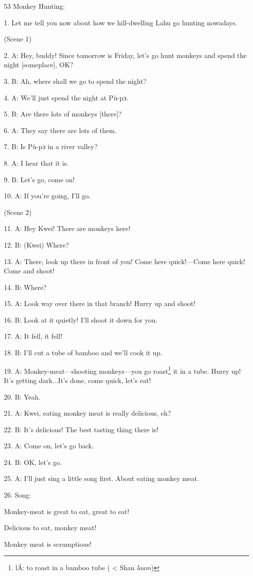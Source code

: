 
53 Monkey Hunting:

1. Let me tell you now about how we hill-dwelling Lahu go hunting nowadays.

(Scene 1)

2. A: Hey, buddy!  Since tomorrow is Friday, let's go hunt monkeys and spend the
night [someplace], OK?

3. B: Ah, where shall we go to spend the night?

4. A: We'll just spend the night at Pù-pɔ.

5. B: Are there lots of monkeys [there]?

6. A: They say there are lots of them.

7. B: Is Pù-pɔ in a river valley?

8. A: I hear that it is.

9. B: Let's go, come on!

10. A: If you're going, I'll go.

(Scene 2)

11. A: Hey Kwei!  There are monkeys here!

12. B: (Kwei) Where?

13. A: There, look up there in front of you!  Come here quick!---Come here quick!
Come and shoot!

14. B: Where?

15. A: Look way over there in that branch!  Hurry up and shoot!

16. B: Look at it quietly!  I'll shoot it down for you.

17. A: It fell, it fell!

18. B: I'll cut a tube of bamboo and we'll cook it up.

19. A: Monkey-meat---shooting monkeys---you go roast\footnote{lÁ: to roast in a bamboo tube ( < Shan \textit{laam})} it in a tube.  Hurry up!
It's getting dark...It's done, come quick, let's eat!

20. B: Yeah.

21. A: Kwei, eating monkey meat is really delicious, eh?

22. B: It's delicious!  The best tasting thing there is!

23. A: Come on, let's go back.

24. B: OK, let's go.

25. A: I'll just sing a little song first.  About eating monkey meat.

26. Song:

Monkey-meat is great to eat, great to eat!

Delicious to eat, monkey meat!

Monkey meat is scrumptious!


